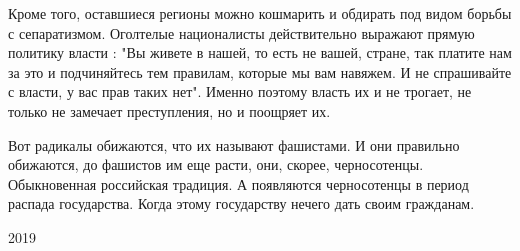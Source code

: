 Кроме того, оставшиеся регионы можно кошмарить и обдирать под видом борьбы с
сепаратизмом. Оголтелые националисты действительно выражают прямую политику
власти : "Вы живете в нашей, то есть не вашей, стране, так платите нам за это и
подчиняйтесь тем правилам, которые мы вам навяжем. И не спрашивайте с власти, у
вас прав таких нет". Именно поэтому власть их и не трогает, не только не
замечает преступления, но и поощряет их. 

Вот радикалы обижаются, что их называют фашистами. И они правильно обижаются,
до фашистов им еще расти, они, скорее, черносотенцы. Обыкновенная российская
традиция. А появляются черносотенцы в период распада государства. Когда этому
государству нечего дать своим гражданам.

2019

